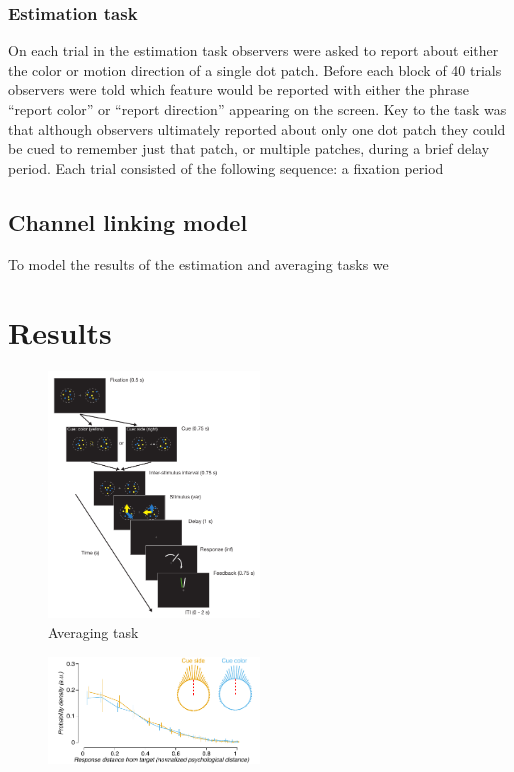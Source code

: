 \subsubsection{Estimation task}


On each trial in the estimation task observers were asked to report about either the color or motion direction of a single dot patch. Before each block of 40 trials observers were told which feature would be reported with either the phrase ``report color'' or ``report direction'' appearing on the screen. Key to the task was that although observers ultimately reported about only one dot patch they could be cued to remember just that patch, or multiple patches, during a brief delay period. Each trial consisted of the following sequence: a fixation period

\subsection{Channel linking model}

To model the results of the estimation and averaging tasks we 

\section{Results}


\begin{figure}
\centering
\includegraphics[keepaspectratio,width=0.5\textwidth]{figs_c4/f1_task.pdf}
\caption[Averaging task]{Averaging task}
\label{fig:c4f1}
\end{figure}


\begin{figure}
\centering
\includegraphics[keepaspectratio,width=0.5\textwidth]{figs_c4/f2_aca_perf.pdf}
\caption[Behavioral task]{}
\label{fig:c4f2}
\end{figure}


